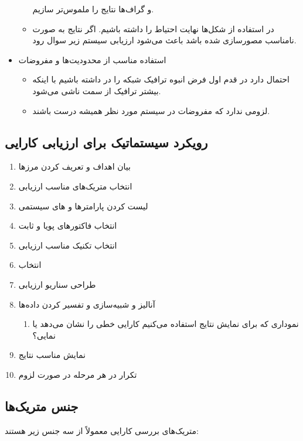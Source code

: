 \begin{itemize}
\begin{itemize}
        و گراف‌ها نتایج را ملموس‌تر سازیم.
        \item در استفاده از شکل‌ها نهایت احتیاط را داشته باشیم. اگر نتایج به
        صورت نامناسب مصورسازی شده باشد باعث می‌شود ارزیابی سیستم زیر سوال رود.
    \end{itemize}
    \item استفاده مناسب از محدودیت‌ها و مفروضات
    \begin{itemize}
        \item احتمال دارد در قدم اول فرض انبوه ترافیک شبکه را در  داشته
        باشیم با اینکه بیشتر ترافیک از سمت  ناشی می‌شود.
        \item لزومی ندارد که مفروضات در سیستم مورد نظر همیشه درست باشند.
    \end{itemize}
\end{itemize}

\subsection{رویکرد سیستماتیک برای ارزیابی کارایی}

\begin{enumerate}
    \item بیان اهداف و تعریف کردن مرز‌ها
    \item انتخاب متریک‌های مناسب ارزیابی
    \item لیست کردن پارامتر‌ها و های سیستمی
    \item انتخاب فاکتور‌های پویا و ثابت
    \item انتخاب تکنیک مناسب ارزیابی
    \item انتخاب 
    \item طراحی سناریو ارزیابی
    \item آنالیز و شبیه‌سازی و تفسیر کردن داده‌ها
    \begin{enumerate}
        \item نموداری که برای نمایش نتایج استفاده می‌کنیم کارایی خطی را نشان
        می‌دهد یا نمایی؟
    \end{enumerate}
    \item نمایش مناسب نتایج
    \item تکرار در هر مرحله در صورت لزوم
\end{enumerate}

\subsection{جنس متریک‌ها}

متریک‌های بررسی کارایی معمولاً از سه جنس زیر هستند:

